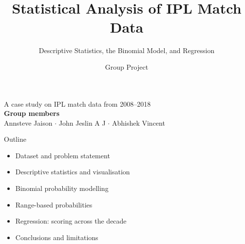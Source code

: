\documentclass[aspectratio=169]{beamer}
\title{Statistical Analysis of IPL Match Data}
\subtitle{Descriptive Statistics, the Binomial Model, and Regression}
\author{Group Project}
\institute{Rajagiri College of Social Sciences (Autonomous)}
\date{}
\begin{document}
\begin{frame}[plain]
\titlepage
\begin{center}
\small A case study on IPL match data from 2008--2018\\[0.7em]
\normalsize\textbf{Group members}\\[0.3em]
Annsteve Jaison \quad $\cdot$ \quad John Jeslin A J \quad $\cdot$ \quad Abhishek Vincent
\end{center}
\end{frame}

\begin{frame}{Outline}
\begin{itemize}
\setlength\itemsep{0.6em}
\item Dataset and problem statement
\item Descriptive statistics and visualisation
\item Binomial probability modelling
\item Range-based probabilities
\item Regression: scoring across the decade
\item Conclusions and limitations
\end{itemize}
\end{frame}
\end{document}
